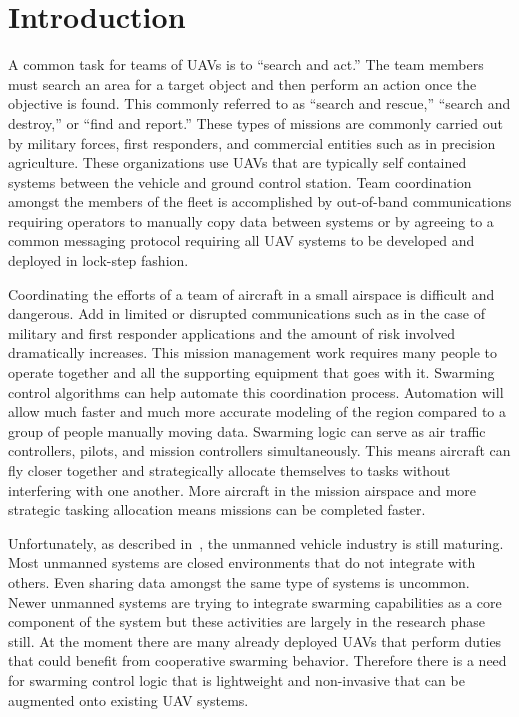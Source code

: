 \chapter{Introduction}
A common task for teams of UAVs is to ``search and act.''  The team members must search an area for a target object and then perform an action once the objective is found.  This commonly referred to as ``search and rescue,'' ``search and destroy,'' or ``find and report.''  These types of missions are commonly carried out by military forces, first responders, and commercial entities such as in precision agriculture.  These organizations use UAVs that are typically self contained systems between the vehicle and ground control station.  Team coordination amongst the members of the fleet is accomplished by out-of-band communications requiring operators to manually copy data between systems or by agreeing to a common messaging protocol requiring all UAV systems to be developed and deployed in lock-step fashion.  

Coordinating the efforts of a team of aircraft in a small airspace is difficult and dangerous.  Add in limited or disrupted communications such as in the case of military and first responder applications and the amount of risk involved dramatically increases.  This mission management work requires many people to operate together and all the supporting equipment that goes with it. Swarming control algorithms can help automate this coordination process.  Automation will allow much faster and much more accurate modeling of the region compared to a group of people manually moving data.  Swarming logic can serve as air traffic controllers, pilots, and mission controllers simultaneously.  This means aircraft can fly closer together and strategically allocate themselves to tasks without interfering with one another.  More aircraft in the mission airspace and more strategic tasking allocation means missions can be completed faster.

Unfortunately, as described in~\textcite{dod_uas_roadmap}, the unmanned vehicle industry is still maturing.  Most unmanned systems are closed environments that do not integrate with others.  Even sharing data amongst the same type of systems is uncommon.  Newer unmanned systems are trying to integrate swarming capabilities as a core component of the system but these activities are largely in the research phase still.  At the moment there are many already deployed UAVs that perform duties that could benefit from cooperative swarming behavior.  Therefore there is a need for swarming control logic that is lightweight and non-invasive that can be augmented onto existing UAV systems.

